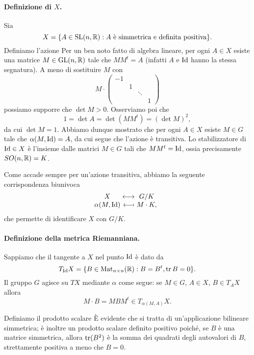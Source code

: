 \paragraph*{Definizione di $X$.} Sia
\[
X=\{A\in\operatorname{SL}(n,\mathbb{R}):\text{$A$ è simmetrica e definita positiva}\}.
\]
Definiamo l'azione
Per un ben noto fatto di algebra lineare, per ogni $A\in X$ esiste una matrice $M\in\operatorname{GL}(n,\mathbb{R})$ tale che $MM^t=A$ (infatti $A$ e $\operatorname{Id}$ hanno la stessa segnatura). A meno di sostituire $M$ con
\[
M\cdot\begin{pmatrix}-1&&&\\&1&&\\&&\ddots&\\&&&1\end{pmatrix}
\]
possiamo supporre che $\det M>0$. Osserviamo poi che
\[
1=\det A=\det(MM^t)=(\det M)^2,
\]
da cui $\det M=1$. Abbiamo dunque mostrato che per ogni $A\in X$ esiste $M\in G$ tale che $\alpha(M,\operatorname{Id})=A$, da cui segue che l'azione è transitiva. Lo stabilizzatore di $\operatorname{Id}\in X$ è l'insieme dalle matrici $M\in G$ tali che $MM^t=\operatorname{Id}$, ossia precisamente $SO(n,\mathbb{R})=K$.

Come accade sempre per un'azione transitiva, abbiamo la seguente corrispondenza biunivoca
\begin{equation*}
\begin{array}{@{}c@{{}\mathrel{}}c@{{}\mathrel{}}c}
X&\longleftrightarrow&G/K\\
\alpha(M,\Id)&\longmapsfrom& M\cdot K,
\end{array}
\end{equation*}
che permette di identificare $X$ con $G/K$.

\paragraph*{Definizione della metrica Riemanniana.} Sappiamo che il tangente a $X$ nel punto $\operatorname{Id}$ è dato da
\[
T_{\operatorname{Id}}X=\{B\in\operatorname{Mat}_{n\times n}(\mathbb{R}):B=B^t,\operatorname{tr} B=0\}.
\]
Il gruppo $G$ agisce su $TX$ mediante $\alpha$ come segue: se $M\in G$, $A\in X$, $B\in T_AX$ allora
\[
M\cdot B=MBM^t\in T_{\alpha(M,A)}X.
\]

Definiamo il prodotto scalare
È evidente che si tratta di un'applicazione bilineare simmetrica; è inoltre un prodotto scalare definito positivo poiché, se $B$ è una matrice simmetrica, allora $\operatorname{tr}(B^2)$ è la somma dei quadrati degli autovalori di $B$, strettamente positiva a meno che $B=0$.

